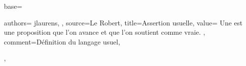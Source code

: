 {
  base={
    authors={
      jlaurens,
    },
    source=Le Robert,
    title=Assertion usuelle,
    value={
      Une  est une proposition que l'on avance et que l'on soutient comme vraie.
    },
    comment={Définition du langage usuel},
    
  },
}
